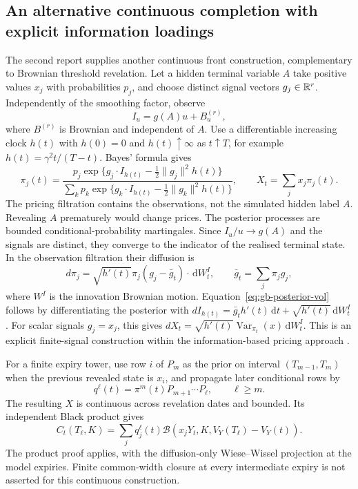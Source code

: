 \documentclass[11pt,a4paper]{article}
\numberwithin{equation}{section}
\theoremstyle{definition}\newtheorem{definition}[theorem]{Definition}
\theoremstyle{remark}\newtheorem{remark}[theorem]{Remark}
\newcommand{\dd}{\,\mathrm d}\newcommand{\dt}{\,\mathrm dt}
\newcommand{\Black}{\mathcal B}\newcommand{\LC}{\mathcal L}
\begin{document}
\subsection{An alternative continuous completion with explicit information loadings}
\label{sec:bates-information}
The second report supplies another continuous front construction, complementary to Brownian threshold revelation. Let a hidden terminal variable $A$ take positive values $x_j$ with probabilities $p_j$, and choose distinct signal vectors $g_j\in\mathbb R^r$. Independently of the smoothing factor, observe
\[
 I_u=g(A)u+B_u^{(r)},
\]
where $B^{(r)}$ is Brownian and independent of $A$. Use a differentiable increasing clock $h(t)$ with $h(0)=0$ and $h(t)\uparrow\infty$ as $t\uparrow T$, for example $h(t)=\gamma^2t/(T-t)$. Bayes' formula gives
\begin{equation}
 \pi_j(t)=\frac{p_j\exp\{g_j\cdot I_{h(t)}-\tfrac12\|g_j\|^2h(t)\}}
                  {\sum_kp_k\exp\{g_k\cdot I_{h(t)}-\tfrac12\|g_k\|^2h(t)\}},
 \qquad X_t=\sum_jx_j\pi_j(t).
 \label{eq:gb-posterior}
\end{equation}
The pricing filtration contains the observations, not the simulated hidden label $A$. Revealing $A$ prematurely would change prices. The posterior processes are bounded conditional-probability martingales. Since $I_u/u\to g(A)$ and the signals are distinct, they converge to the indicator of the realised terminal state. In the observation filtration their diffusion is
\begin{equation}
 d\pi_j=\sqrt{h'(t)}\pi_j(g_j-\bar g_t)\cdot\dd W_t^I,
 \qquad \bar g_t=\sum_j\pi_jg_j,
 \label{eq:gb-posterior-vol}
\end{equation}
where $W^I$ is the innovation Brownian motion. Equation~\eqref{eq:gb-posterior-vol} follows by differentiating the posterior with $dI_{h(t)}=\bar g_t h'(t)\dt+\sqrt{h'(t)}\dd W_t^I$. For scalar signals $g_j=x_j$, this gives $dX_t=\sqrt{h'(t)}\operatorname{Var}_{\pi_t}(x)\dd W_t^I$. This is an explicit finite-signal construction within the information-based pricing approach \cite{InformationPricing}.

For a finite expiry tower, use row $i$ of $P_m$ as the prior on interval $(T_{m-1},T_m)$ when the previous revealed state is $x_i$, and propagate later conditional rows by
\[
 q^\ell(t)=\pi^m(t)P_{m+1}\cdots P_\ell,\qquad \ell\geq m.
\]
The resulting $X$ is continuous across revelation dates and bounded. Its independent Black product gives
\[
 C_t(T_\ell,K)=\sum_jq_j^\ell(t)
    \Black(x_jY_t,K,V_Y(T_\ell)-V_Y(t)).
\]
The product proof applies, with the diffusion-only Wiese--Wissel projection at the model expiries. Finite common-width closure at every intermediate expiry is not asserted for this continuous construction.
\end{document}

